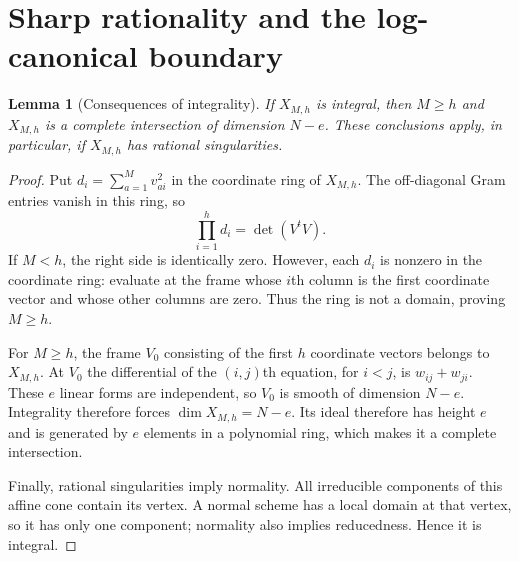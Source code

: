 \documentclass[11pt]{article}
\numberwithin{equation}{section}
\newtheorem{lemma}[theorem]{Lemma}
\theoremstyle{remark}
\begin{document}
\section{Sharp rationality and the log-canonical boundary}\label{sec:sharpness}
\begin{lemma}[Consequences of integrality]\label{lem:integralCI}
If $X_{M,h}$ is integral, then $M\ge h$ and $X_{M,h}$ is a
complete intersection of dimension $N-e$. These conclusions apply,
in particular, if $X_{M,h}$ has rational singularities.
\end{lemma}
\begin{proof}
Put $d_i=\sum_{a=1}^M v_{ai}^2$ in the coordinate ring of $X_{M,h}$.
The off-diagonal Gram entries vanish in this ring, so
\[
 \prod_{i=1}^h d_i=\det(V^tV).
\]
If $M<h$, the right side is identically zero. However, each $d_i$
is nonzero in the coordinate ring: evaluate at the frame whose
$i$th column is the first coordinate vector and whose other columns
are zero. Thus the ring is not a domain, proving $M\ge h$.

For $M\ge h$, the frame $V_0$ consisting of the first $h$ coordinate
vectors belongs to $X_{M,h}$. At $V_0$ the differential of the
$(i,j)$th equation, for $i<j$, is $w_{ij}+w_{ji}$. These $e$
linear forms are independent, so $V_0$ is smooth of dimension
$N-e$. Integrality therefore forces $\dim X_{M,h}=N-e$.
Its ideal therefore has height $e$ and is generated by $e$ elements
in a polynomial ring, which makes it a complete intersection.

Finally, rational singularities imply normality. All irreducible
components of this affine cone contain its vertex. A normal scheme
has a local domain at that vertex, so it has only one component;
normality also implies reducedness. Hence it is integral.
\end{proof}
\end{document}
